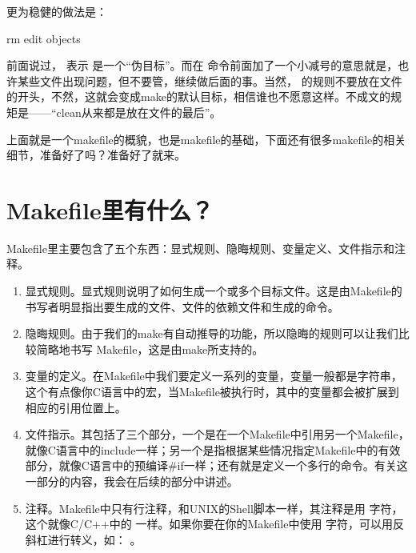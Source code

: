 \documentclass[a4paper,10pt]{sphinxmanual}
\begin{document}
更为稳健的做法是：

\begin{sphinxVerbatim}[commandchars=\\\{\}]
 
    \PYGZhy{}rm edit objects
\end{sphinxVerbatim}

前面说过，  表示  是一个“伪目标”。而在  命令前面加了一个小减号的意思就是，也许某些文件出现问题，但不要管，继续做后面的事。当然，  的规则不要放在文件的开头，不然，这就会变成make的默认目标，相信谁也不愿意这样。不成文的规矩是——“clean从来都是放在文件的最后”。

上面就是一个makefile的概貌，也是makefile的基础，下面还有很多makefile的相关细节，准备好了吗？准备好了就来。


\section{Makefile里有什么？}
\label{\detokenize{introduction:id6}}
Makefile里主要包含了五个东西：显式规则、隐晦规则、变量定义、文件指示和注释。
\begin{enumerate}
\def\theenumi{\arabic{enumi}}
\def\labelenumi{\theenumi .}
\makeatletter\def\p@enumii{\p@enumi \theenumi .}\makeatother
\item {} 
显式规则。显式规则说明了如何生成一个或多个目标文件。这是由Makefile的书写者明显指出要生成的文件、文件的依赖文件和生成的命令。

\item {} 
隐晦规则。由于我们的make有自动推导的功能，所以隐晦的规则可以让我们比较简略地书写
Makefile，这是由make所支持的。

\item {} 
变量的定义。在Makefile中我们要定义一系列的变量，变量一般都是字符串，这个有点像你C语言中的宏，当Makefile被执行时，其中的变量都会被扩展到相应的引用位置上。

\item {} 
文件指示。其包括了三个部分，一个是在一个Makefile中引用另一个Makefile，就像C语言中的include一样；另一个是指根据某些情况指定Makefile中的有效部分，就像C语言中的预编译\#if一样；还有就是定义一个多行的命令。有关这一部分的内容，我会在后续的部分中讲述。

\item {} 
注释。Makefile中只有行注释，和UNIX的Shell脚本一样，其注释是用 \sphinxcode{\sphinxupquote{\#}} 字符，这个就像C/C++中的 \sphinxcode{\sphinxupquote{//}} 一样。如果你要在你的Makefile中使用 \sphinxcode{\sphinxupquote{\#}} 字符，可以用反斜杠进行转义，如： \sphinxcode{\sphinxupquote{\textbackslash{}\#}}  。

\end{enumerate}
\end{document}
